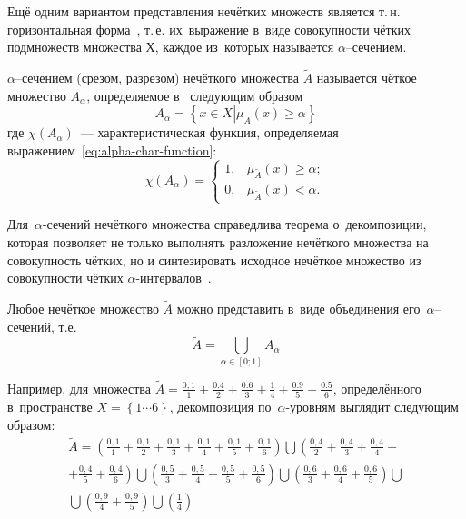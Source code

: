 Ещё одним вариантом представления нечётких множеств является т.\,н. горизонтальная форма~\cite{Pegat}, т.\,е. их~выражение в~виде совокупности чётких подмножеств множества Х, каждое из~которых называется $\alpha$--сечением. 
\begin{mydef} 
$\alpha$--сечением (срезом, разрезом) нечёткого множества $\tilde{A}$ называется чёткое множество $A_\alpha$, определяемое в~\cite{Rutkovskaya, Pospelov, Borisov_Alexeev_Msk, Ryzhov} следующим образом 
\begin{equation}
\label{eq:alpha-cut}
	A_{\alpha}= \left\{ x\in X \left| \mu_{\tilde A}\left( x \right)\geqslant \alpha \right. \right\}
\end{equation}
где $\chi \left( {{A}_{\alpha }} \right)$~--- характеристическая функция, определяемая выражением~\eqref{eq:alpha-char-function}:
\begin{equation}
\label{eq:alpha-char-function}
	\chi \left( {{A}_{\alpha }} \right)=\left\{
		\begin{aligned}
			1, & \mu_{\tilde A}\left( x \right) \geqslant \alpha; \\
			0, & \mu_{\tilde A}\left( x \right) < \alpha.
		\end{aligned}		 
	\right.
\end{equation}
\end{mydef}

Для~$\alpha$-сечений нечёткого множества справедлива теорема о~декомпозиции, которая позволяет не только выполнять разложение нечёткого множества на совокупность чётких, но и синтезировать исходное нечёткое множество из совокупности чётких $\alpha$-интервалов~\cite{Kaufmann, Hanss_Engineering}.
\begin{theorem}
Любое нечёткое множество $\tilde{A}$ можно представить в~виде объединения его~$\alpha$--сечений, т.е.
\begin{equation}
\label{eq:alpha-cut-theorem}
	\tilde{A}=\bigcup\limits_{\alpha \in \left[ 0;1 \right]}{A_\alpha}
\end{equation}
\end{theorem}

Например, для множества $\displaystyle \tilde{A}=\frac{0,1}{1}+\frac{0.4}{2}+\frac{0.6}{3}+\frac{1}{4}+\frac{0.9}{5}+\frac{0.5}{6}$, определённого в~пространстве $\displaystyle X=\left\{ 1 \cdots 6 \right\}$, декомпозиция по~$\alpha$-уровням выглядит следующим образом:
\begin{gather*}
	  \tilde{A}=\left( \frac{0,1}{1}+\frac{0,1}{2}+\frac{0,1}{3}+\frac{0,1}{4}+\frac{0,1}{5}+\frac{0,1}{6} \right)\bigcup \left( \frac{0,4}{2}+\frac{0,4}{3}+\frac{0,4}{4}+\right.\\
	  \left. +\frac{0,4}{5}+\frac{0,4}{6} \right) \bigcup\left( \frac{0,5}{3}+\frac{0,5}{4}+\frac{0,5}{5}+\frac{0,5}{6} \right) \bigcup \left( \frac{0,6}{3}+\frac{0,6}{4}+\frac{0,6}{5} \right) \bigcup {} \\
	  {} \bigcup \left( \frac{0,9}{4}+\frac{0,9}{5} \right) \bigcup \left( \frac{1}{4} \right) 
\end{gather*}

